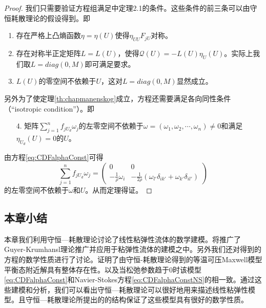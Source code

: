 	\begin{proof}
		我们只需要验证方程组满足\cite{yang2015validity}中定理2.1的条件。这些条件的前三条可以由守恒耗散理论的假设得到。即
		\begin{enumerate}
			\item 	存在严格上凸熵函数$\eta = \eta(U)$使得$\eta_{UU} F_{jU}$对称。
			\item 	存在对称半正定矩阵$L=L(U)$，使得$\mathcal{Q}(U) = -L(U) \eta_{U}(U)$。实际上我们取$L = diag(0,M)$即可满足要求。
			\item   $L(U)$的零空间不依赖于$U$，这对$L = diag(0,M)$显然成立。
		\end{enumerate}
		
		另外为了使定理\ref{th:chapmanenskog}成立，方程还需要满足各向同性条件（“isotropic condition”）。即
		\begin{enumerate}
			\item[4.]矩阵$\sum_{j=1}^n f_{jU_d} \omega_j$的左零空间不依赖于$\omega = (\omega_1,\omega_2,\cdots,\omega_n) \neq 0$和满足$\eta_{U_d}(U)=0$的$U$。
		\end{enumerate}
		由方程\eqref{eq:CDFalphaConst}可得
		\begin{equation*}
			\sum_{j=1}^n f_{jU_d} \omega_j = \left( \begin{matrix}
				0 & 0 \\
				-\frac{1}{\rho} \omega_i & -\frac{1}{2 \rho} (\omega_{l'} \delta_{ik'} + \omega_{k'} \delta_{il'})
			\end{matrix}
			\right)
		\end{equation*}
		的左零空间不依赖于$\omega$和$U$。从而定理得证。
	\end{proof}
	\subsection{本章小结}
	本章我们利用守恒—耗散理论讨论了线性粘弹性流体的数学建模。将推广了Guyer-Krumhansl理论推广并应用于粘弹性流体的建模之中。另外我们还对得到的方程的数学性质进行了讨论。证明了由守恒-耗散理论得到的等温可压Maxwell模型平衡态附近解具有整体存在性。以及当松弛参数趋于$0$时该模型\eqref{eq:CDFalphaConst}和Navier-Stokes方程\eqref{eq:CDFalphaConstNS}的相一致。通过这些建模和分析，我们可以看出守恒—耗散理论可以很好地用来描述线性粘弹性模型。且守恒—耗散理论所提出的的结构保证了这些模型具有很好的数学性质。


